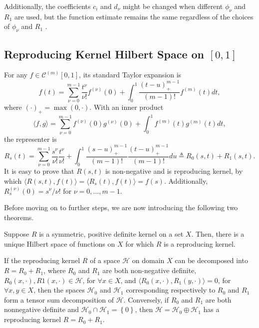 Additionally, the coefficients $c_i$ and $d_\nu$ might be changed when different $\phi_\nu$ and $R_1$ are used, but the function estimate remains the same regardless of the choices of $\phi_\nu$ and $R_1$ \citep{gu2013smoothing}.


\subsection{Reproducing Kernel Hilbert Space on $[0,1]$}

For any $f\in \mathcal{C}^{(m)}[0,1]$, its standard Taylor expansion is  
\begin{equation}
f(t) = \sum_{\nu=0}^{m-1}\frac{t^\nu}{\nu!}f^{(\nu)}(0) + \int_{0}^{1}\frac{(t-u)_+^{m-1}}{(m-1)!}f^{(m)}(t)dt,
\end{equation}
where $(\cdot)_+ =\max(0, \cdot)$. With an inner product 
\begin{equation}
\langle f,g \rangle = \sum_{\nu=0}^{m-1}f^{(\nu)}(0)g^{(\nu)}(0) +  \int_{0}^{1}f^{(m)}(t) g^{(m)}(t)dt,
\end{equation}
the representer is 
\begin{equation}\label{GaussianProcessKernelR}
R_s(t) =\sum_{\nu=0}^{m-1} \frac{s^{\nu}}{\nu!} \frac{t^{\nu}}{\nu!} +\int_0^1\frac{ (s-u)_+^{m-1}}{(m-1)!} \frac{ (t-u)_+^{m-1}}{(m-1)!} du \triangleq R_0(s,t)+R_1(s,t). 
\end{equation}
It is easy to prove that $R(s,t)$ is non-negative and is reproducing kernel, by which $\langle R(s,t),f(t) \rangle = \langle R_s(t),f(t) \rangle=f(s)$. Additionally, $R_s^{(\nu)}(0) = s^\nu/\nu!$ for $\nu = 0,\ldots, m-1$.

Before moving on to further steps, we are now introducing the following two theorems. 
\begin{theorem}\citep{aronszajn1950theory}\label{theoremRKHS}
Suppose $R$ is a symmetric, positive definite kernel on a set $X$. Then, there is a unique Hilbert space of functions on $X$ for which $R$ is a reproducing kernel. 
\end{theorem}
\begin{theorem}\citep{gu2013smoothing}\label{theoremKernel}
If the reproducing kernel $R$ of a space $\mathcal{H}$ on domain $X$ can
be decomposed into $R = R_0 + R_1$, where $R_0$ and $R_1$ are both non-negative definite, $R_0(x, \cdot),R1(x,\cdot) \in \mathcal{H}$, for $ \forall x \in X$, and $\langle R_0(x, \cdot),R_1(y, \cdot) \rangle= 0$, for $\forall x, y \in X$, then the spaces $\mathcal{H}_0$ and $\mathcal{H}_1$ corresponding respectively to $R_0$ and $R_1$ form a tensor sum decomposition of $\mathcal{H}$. Conversely, if $R_0$ and $R_1$ are both  nonnegative definite and $\mathcal{H}_0 \cap \mathcal{H}_1 =\left\lbrace 0\right\rbrace$, then $\mathcal{H} =\mathcal{H}_0 \oplus \mathcal{H}_1$ has a reproducing kernel $R = R_0 + R_1$.
\end{theorem}

